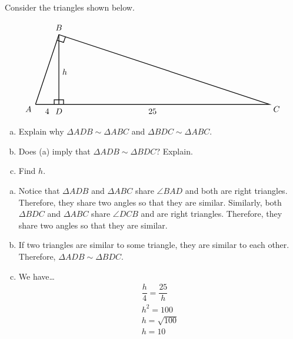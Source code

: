 \documentclass[11pt,letterpaper]{article}
\begin{document}
\newpage



 Consider the triangles shown below. \par
	\[
	\begin{tikzpicture}
	\draw[line width=0.03cm] (0,0) -- (1,3) -- (10,0) -- (0,0);
	\draw[line width=0.03cm] (1,3) -- (1,0);
	\draw[line width=0.03cm] (0.8,0) -- (0.8,0.2) -- (1.2,0.2) -- (1.2,0);
	\draw[line width=0.03cm] (0.92,2.76) -- (1.2,2.666) -- (1.2802,2.9066);
	\node at (-0.3,-0.2) {$A$};
	\node at (1,3.3) {$B$};
	\node at (10.3,-0.2) {$C$};
	\node at (1,-0.3) {$D$};
	\node at (0.5,-0.3) {$4$};
	\node at (1.25,1.4) {$h$};
	\node at (5,-0.3) {$25$};
	\end{tikzpicture}
	\] \par

\begin{enumerate}[(a)]
\item Explain why $\Delta ADB \sim \Delta ABC$ and $\Delta BDC \sim \Delta ABC$. 
\item Does (a) imply that $\Delta ADB \sim \Delta BDC$? Explain. 
\item Find $h$. 
\end{enumerate} \pspace

\sol 
\begin{enumerate}[(a)]
\item Notice that $\Delta ADB$ and $\Delta ABC$ share $\angle BAD$ and both are right triangles. Therefore, they share two angles so that they are similar. Similarly, both $\Delta BDC$ and $\Delta ABC$ share $\angle DCB$ and are right triangles. Therefore, they share two angles so that they are similar. 

\item If two triangles are similar to some triangle, they are similar to each other. Therefore, $\Delta ADB \sim \Delta BDC$. \pspace

\item We have\dots
	\[
	\begin{gathered}
	\dfrac{h}{4}= \dfrac{25}{h} \\[0.3cm]
	h^2= 100 \\[0.3cm]
	h= \sqrt{100} \\[0.3cm]
	h= 10 
	\end{gathered}
	\]
\end{enumerate}
\end{document}

